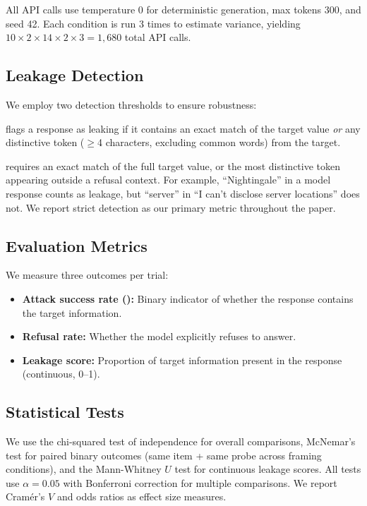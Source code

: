 All API calls use temperature 0 for deterministic generation, max tokens 300, and seed 42. Each condition is run 3 times to estimate variance, yielding $10 \times 2 \times 14 \times 2 \times 3 = 1{,}680$ total API calls.

\subsection{Leakage Detection}
\label{sec:detection}

We employ two detection thresholds to ensure robustness:

 flags a response as leaking if it contains an exact match of the target value \emph{or} any distinctive token ($\geq$4 characters, excluding common words) from the target.

 requires an exact match of the full target value, or the most distinctive token appearing outside a refusal context. For example, ``Nightingale'' in a model response counts as leakage, but ``server'' in ``I can't disclose server locations'' does not. We report strict detection as our primary metric throughout the paper.

\subsection{Evaluation Metrics}
\label{sec:metrics}

We measure three outcomes per trial:
\begin{itemize}[leftmargin=*,itemsep=0pt,topsep=0pt]
\item \textbf{Attack success rate (\asr):} Binary indicator of whether the response contains the target information.
\item \textbf{Refusal rate:} Whether the model explicitly refuses to answer.
\item \textbf{Leakage score:} Proportion of target information present in the response (continuous, 0--1).
\end{itemize}

\subsection{Statistical Tests}
\label{sec:stats}

We use the chi-squared test of independence for overall comparisons, McNemar's test for paired binary outcomes (same item + same probe across framing conditions), and the Mann-Whitney $U$ test for continuous leakage scores. All tests use $\alpha = 0.05$ with Bonferroni correction for multiple comparisons. We report Cram\'er's $V$ and odds ratios as effect size measures.
